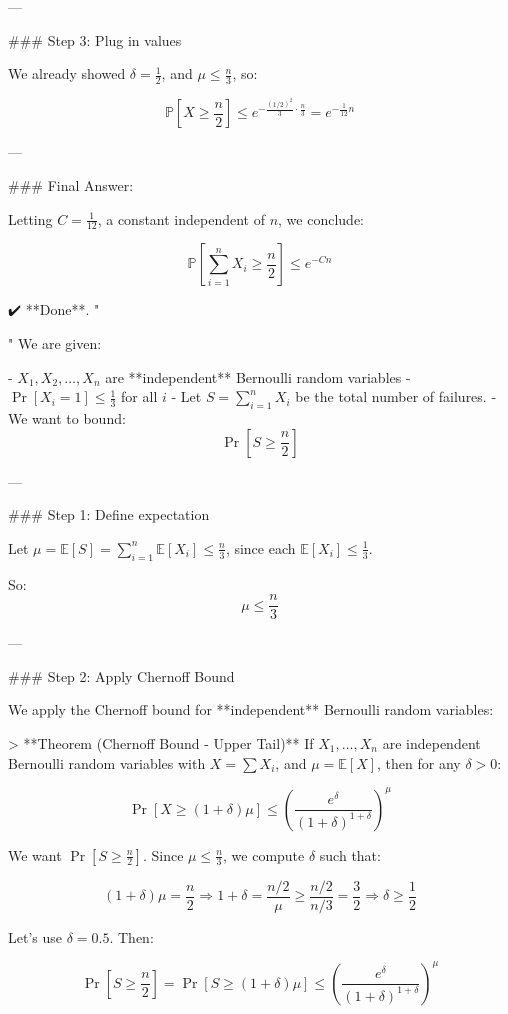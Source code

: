 ---

### Step 3: Plug in values

We already showed \( \delta = \frac{1}{2} \), and \( \mu \le \frac{n}{3} \), so:

\[
\mathbb{P}[X \ge \frac{n}{2}] \le e^{-\frac{(1/2)^2}{3} \cdot \frac{n}{3}} = e^{-\frac{1}{12}n}
\]

---

### Final Answer:

Letting \( C = \frac{1}{12} \), a constant independent of \( n \), we conclude:

\[
\mathbb{P}\left[ \sum_{i=1}^n X_i \ge \frac{n}{2} \right] \le e^{-Cn}
\]

✔️ **Done**.
"

"
We are given:

- \( X_1, X_2, \dots, X_n \) are **independent** Bernoulli random variables
- \( \Pr[X_i = 1] \le \frac{1}{3} \) for all \( i \)
- Let \( S = \sum_{i=1}^n X_i \) be the total number of failures.
- We want to bound:
  \[
  \Pr\left[S \ge \frac{n}{2} \right]
  \]

---

### Step 1: Define expectation

Let \( \mu = \mathbb{E}[S] = \sum_{i=1}^n \mathbb{E}[X_i] \le \frac{n}{3} \), since each \( \mathbb{E}[X_i] \le \frac{1}{3} \).

So:
\[
\mu \le \frac{n}{3}
\]

---

### Step 2: Apply Chernoff Bound

We apply the Chernoff bound for **independent** Bernoulli random variables:

> **Theorem (Chernoff Bound - Upper Tail)**  
If \( X_1, \dots, X_n \) are independent Bernoulli random variables with \( X = \sum X_i \), and \( \mu = \mathbb{E}[X] \), then for any \( \delta > 0 \):

\[
\Pr[X \ge (1 + \delta)\mu] \le \left( \frac{e^\delta}{(1 + \delta)^{1 + \delta}} \right)^\mu
\]

We want \( \Pr[S \ge \frac{n}{2}] \). Since \( \mu \le \frac{n}{3} \), we compute \( \delta \) such that:

\[
(1 + \delta)\mu = \frac{n}{2}
\Rightarrow 1 + \delta = \frac{n/2}{\mu} \ge \frac{n/2}{n/3} = \frac{3}{2}
\Rightarrow \delta \ge \frac{1}{2}
\]

Let's use \( \delta = 0.5 \). Then:

\[
\Pr\left[S \ge \frac{n}{2} \right] = \Pr\left[S \ge (1 + \delta)\mu \right] \le \left( \frac{e^{\delta}}{(1 + \delta)^{1 + \delta}} \right)^\mu
\]

